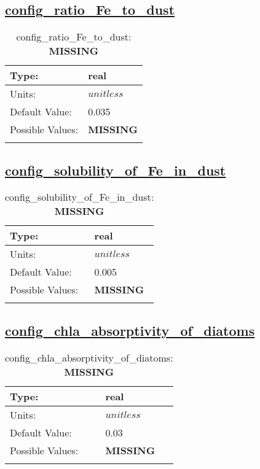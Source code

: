 \subsection[config\_ratio\_Fe\_to\_dust]{\hyperref[sec:nm_tab_biogeochemistry]{config\_ratio\_Fe\_to\_dust}}
\label{subsec:nm_sec_config_ratio_Fe_to_dust}
\begin{center}
\begin{longtable}{| p{2.0in} || p{4.0in} |}
    \hline
    Type: & real \\
    \hline
    Units: & $unitless$ \\
    \hline
    Default Value: & 0.035 \\
    \hline
    Possible Values: & {\bf \color{red} MISSING} \\
    \hline
    \caption{config\_ratio\_Fe\_to\_dust: {\bf \color{red} MISSING}}
\end{longtable}
\end{center}
\subsection[config\_solubility\_of\_Fe\_in\_dust]{\hyperref[sec:nm_tab_biogeochemistry]{config\_solubility\_of\_Fe\_in\_dust}}
\label{subsec:nm_sec_config_solubility_of_Fe_in_dust}
\begin{center}
\begin{longtable}{| p{2.0in} || p{4.0in} |}
    \hline
    Type: & real \\
    \hline
    Units: & $unitless$ \\
    \hline
    Default Value: & 0.005 \\
    \hline
    Possible Values: & {\bf \color{red} MISSING} \\
    \hline
    \caption{config\_solubility\_of\_Fe\_in\_dust: {\bf \color{red} MISSING}}
\end{longtable}
\end{center}
\subsection[config\_chla\_absorptivity\_of\_diatoms]{\hyperref[sec:nm_tab_biogeochemistry]{config\_chla\_absorptivity\_of\_diatoms}}
\label{subsec:nm_sec_config_chla_absorptivity_of_diatoms}
\begin{center}
\begin{longtable}{| p{2.0in} || p{4.0in} |}
    \hline
    Type: & real \\
    \hline
    Units: & $unitless$ \\
    \hline
    Default Value: & 0.03 \\
    \hline
    Possible Values: & {\bf \color{red} MISSING} \\
    \hline
    \caption{config\_chla\_absorptivity\_of\_diatoms: {\bf \color{red} MISSING}}
\end{longtable}
\end{center}
